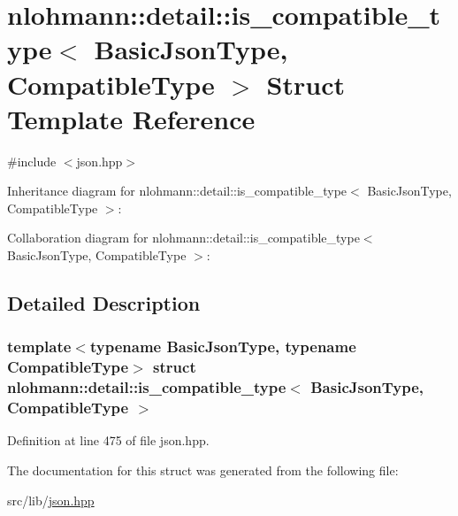 \hypertarget{structnlohmann_1_1detail_1_1is__compatible__type}{}\section{nlohmann\+:\+:detail\+:\+:is\+\_\+compatible\+\_\+type$<$ Basic\+Json\+Type, Compatible\+Type $>$ Struct Template Reference}
\label{structnlohmann_1_1detail_1_1is__compatible__type}


{\ttfamily \#include $<$json.\+hpp$>$}



Inheritance diagram for nlohmann\+:\+:detail\+:\+:is\+\_\+compatible\+\_\+type$<$ Basic\+Json\+Type, Compatible\+Type $>$\+:


Collaboration diagram for nlohmann\+:\+:detail\+:\+:is\+\_\+compatible\+\_\+type$<$ Basic\+Json\+Type, Compatible\+Type $>$\+:


\subsection{Detailed Description}
\subsubsection*{template$<$typename Basic\+Json\+Type, typename Compatible\+Type$>$\newline
struct nlohmann\+::detail\+::is\+\_\+compatible\+\_\+type$<$ Basic\+Json\+Type, Compatible\+Type $>$}



Definition at line 475 of file json.\+hpp.



The documentation for this struct was generated from the following file\+:\begin{DoxyCompactItemize}
\item 
src/lib/\hyperlink{json_8hpp}{json.\+hpp}\end{DoxyCompactItemize}
